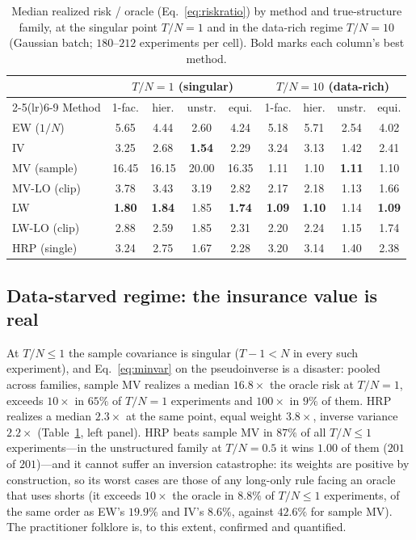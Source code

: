 \documentclass[11pt]{article}
\newcommand{\TN}{T/N}
\begin{document}
\begin{table}[t]
\centering
\caption{Median realized risk / oracle (Eq.~\ref{eq:riskratio}) by method and
true-structure family, at the singular point $\TN=1$ and in the data-rich
regime $\TN=10$ (Gaussian batch; $180$--$212$ experiments per cell). Bold
marks each column's best method.}
\label{tab:headline}
\small
\begin{tabular}{l cccc @{\hskip 1.8em} cccc}
\toprule
& \multicolumn{4}{c}{$\TN=1$ (singular)} & \multicolumn{4}{c}{$\TN=10$ (data-rich)} \\
\cmidrule(lr){2-5}\cmidrule(lr){6-9}
Method & 1-fac. & hier. & unstr. & equi. & 1-fac. & hier. & unstr. & equi. \\
\midrule
EW ($1/N$)        & 5.65 & 4.44 & 2.60 & 4.24 & 5.18 & 5.71 & 2.54 & 4.02 \\
IV                & 3.25 & 2.68 & \textbf{1.54} & 2.29 & 3.24 & 3.13 & 1.42 & 2.41 \\
MV (sample)       & 16.45 & 16.15 & 20.00 & 16.35 & 1.11 & 1.10 & \textbf{1.11} & 1.10 \\
MV-LO (clip)      & 3.78 & 3.43 & 3.19 & 2.82 & 2.17 & 2.18 & 1.13 & 1.66 \\
LW                & \textbf{1.80} & \textbf{1.84} & 1.85 & \textbf{1.74} & \textbf{1.09} & \textbf{1.10} & 1.14 & \textbf{1.09} \\
LW-LO (clip)      & 2.88 & 2.59 & 1.85 & 2.31 & 2.20 & 2.24 & 1.15 & 1.74 \\
HRP (single)      & 3.24 & 2.75 & 1.67 & 2.28 & 3.20 & 3.14 & 1.40 & 2.38 \\
\bottomrule
\end{tabular}
\end{table}

\subsection{Data-starved regime: the insurance value is real}
\label{sec:starved}

At $\TN\le1$ the sample covariance is singular ($T-1<N$ in every such
experiment), and Eq.~\eqref{eq:minvar} on the pseudoinverse is a disaster:
pooled across families, sample MV realizes a median $16.8\times$ the oracle
risk at $\TN=1$, exceeds $10\times$ in $65\%$ of $\TN=1$ experiments and
$100\times$ in $9\%$ of them. HRP realizes a median $2.3\times$ at the same
point, equal weight $3.8\times$, inverse variance $2.2\times$
(Table~\ref{tab:headline}, left panel). HRP beats sample MV in $87\%$ of all
$\TN\le1$ experiments---in the unstructured family at $\TN=0.5$ it wins
$1.00$ of them ($201$ of $201$)---and it cannot suffer an inversion
catastrophe: its weights are positive by construction, so its worst cases are
those of any long-only rule facing an oracle that uses shorts (it exceeds
$10\times$ the oracle in $8.8\%$ of $\TN\le1$ experiments, of the same order
as EW's $19.9\%$ and IV's $8.6\%$, against $42.6\%$ for sample MV). The
practitioner folklore is, to this extent, confirmed and quantified.
\end{document}
